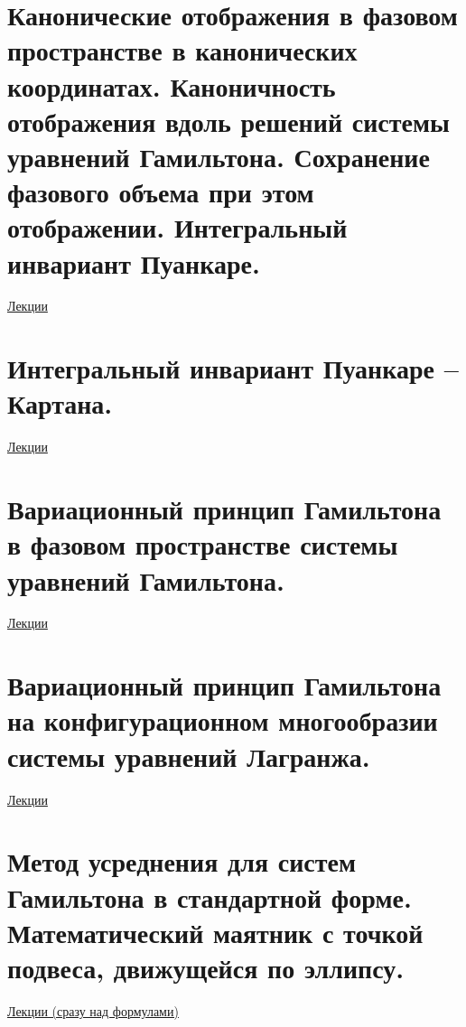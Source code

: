 \documentclass[specialist, subf, href, colorlinks=true, 12pt, times, mtpro, final]{disser}
\theoremstyle{definition}
\begin{document}
    \section{Канонические отображения в фазовом пространстве в канонических координатах. Каноничность отображения вдоль решений системы уравнений Гамильтона. Сохранение фазового объема при этом отображении. Интегральный инвариант Пуанкаре.}
     \label{22}
	\hyperlink {lects.39}{Лекции} \\
    
    \section{Интегральный инвариант Пуанкаре – Картана.}
     \label{23}
    \hyperlink {lects.42}{Лекции} \\
    
    \section{Вариационный принцип Гамильтона в фазовом пространстве системы уравнений Гамильтона.}
     \label{24}
    \hyperlink {lects.44}{Лекции} \\
    
    \section{Вариационный принцип Гамильтона на конфигурационном многообразии системы уравнений Лагранжа.}
     \label{25}
    \hyperlink {lects.45}{Лекции} \\
    
    \section{Метод усреднения для систем Гамильтона в стандартной форме. Математический маятник с точкой подвеса, движущейся по эллипсу.}
     \label{26}
    \hyperlink {lects.47}{Лекции (сразу над формулами)} \\
    
    
    
\end{document}
